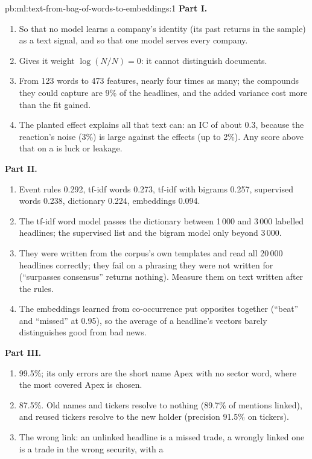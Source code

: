 \begin{solution}{pb:ml:text-from-bag-of-words-to-embeddings:1}
\textbf{Part I.}
\begin{enumerate}
\item So that no model learns a company's identity (its past returns in the sample) as a text signal, and so that one model
serves every company.
\item Gives it weight $\log(N/N) = 0$: it cannot distinguish documents.
\item From 123 words to 473 features, nearly four times as many; the compounds they could capture are 9\% of the headlines,
and the added variance cost more than the fit gained.
\item The planted effect explains all that text can: an IC of about 0.3, because the reaction's noise (3\%) is large against
the effects (up to 2\%). Any score above that on a  is luck or leakage.
\end{enumerate}
\textbf{Part II.}
\begin{enumerate}[resume]
\item Event rules 0.292, tf-idf words 0.273, tf-idf with bigrams 0.257, supervised words 0.238, dictionary 0.224,
embeddings 0.094.
\item The tf-idf word model passes the dictionary between 1\,000 and 3\,000 labelled headlines; the supervised list and
the bigram model only beyond 3\,000.
\item They were written from the corpus's own templates and read all 20\,000 headlines correctly; they fail on a phrasing
they were not written for (``surpasses consensus'' returns nothing). Measure them on text written after the rules.
\item The embeddings learned from co-occurrence put opposites together (``beat'' and ``missed'' at 0.95), so the average of
a headline's vectors barely distinguishes good from bad news.
\end{enumerate}
\textbf{Part III.}
\begin{enumerate}[resume]
\item 99.5\%; its only errors are the short name Apex with no sector word, where the most covered Apex is chosen.
\item 87.5\%. Old names and tickers resolve to nothing (89.7\% of mentions linked), and reused tickers resolve to the new
holder (precision 91.5\% on tickers).
\item The wrong link: an unlinked headline is a missed trade, a wrongly linked one is a trade in the wrong security, with a

\end{enumerate}
\end{solution}

